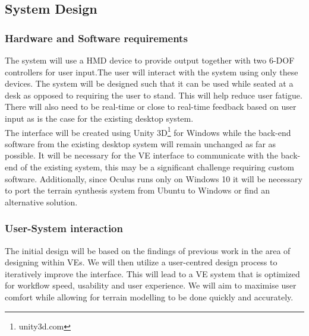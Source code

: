 \documentclass{sig-alternate-05-2015}
\begin{document}
\subsection{System Design}
\subsubsection{Hardware and Software requirements}
The system will use a HMD device to provide output together with two 6-DOF controllers for user input.The user will interact with the system using only these devices. The system will be designed such that it can be used while seated at a desk as opposed to requiring the user to stand. This will help reduce user fatigue\cite{Schultheis2012}. There will also need to be real-time or close to real-time feedback based on user input as is the case for the existing desktop system.\\

The interface will be created using Unity 3D\footnote{unity3d.com} for Windows while the back-end software from the existing desktop system will remain unchanged as far as possible. It will be necessary for the VE interface to communicate with the back-end of the existing system, this may be a significant challenge requiring custom software. Additionally, since Oculus runs only on Windows 10 it will be necessary to port the terrain synthesis system from Ubuntu to Windows or find an alternative solution.

\subsubsection{User-System interaction}
The initial design will be based on the findings of previous work in the area of designing within VEs. We will then utilize a user-centred design process to iteratively improve the interface. This will lead to a VE system that is optimized for workflow speed, usability and user experience. We will aim to maximise user comfort while allowing for terrain modelling to be done quickly and accurately. \\

\end{document}
